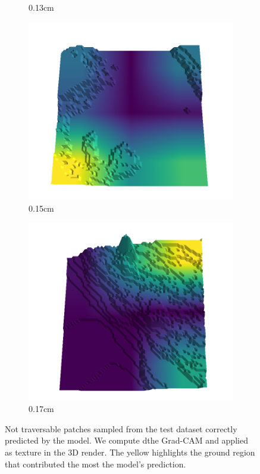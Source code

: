 \begin{figure}[H]
\begin{subfigure}[b]{0.192\linewidth}
        \caption{0.13cm}
        \label{fig : quarry-worst-18}
        \end{subfigure}
        \begin{subfigure}[b]{0.192\linewidth}
        \includegraphics[width=\linewidth]{../img/5/quarry/worst/15-patch-3d-majavi-colormap-180.png}
        \caption{0.15cm}
        \label{fig : quarry-worst-19}
        \end{subfigure}
        \begin{subfigure}[b]{0.192\linewidth}
        \includegraphics[width=\linewidth]{../img/5/quarry/worst/17-patch-3d-majavi-colormap-190.png}
        \caption{0.17cm}
        \label{fig : quarry-worst-20}
        \end{subfigure}
        \caption{Not traversable patches sampled from the test dataset correctly predicted by the model. We compute dthe Grad-CAM and applied as texture in the 3D render. The yellow highlights the ground region that contributed the most the model's prediction. }
        \label{fig : quarry-worst}
        \end{figure}
